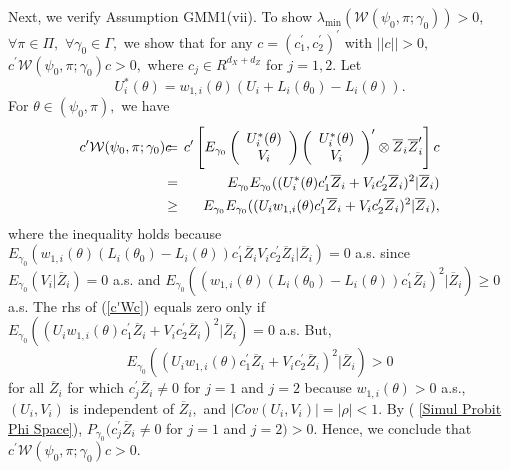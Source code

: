 \documentclass[12pt,titlepage,final,oneside,letterpaper]{article}
\begin{document}
Next, we verify Assumption GMM1(vii). To show $\lambda _{\min }(\mathcal{W}%
(\psi _{0},\pi ;\gamma _{0}))>0,$ $\forall \pi \in \Pi ,$ $\forall \gamma
_{0}\in \Gamma ,$ we show that for any $c=(c_{1}^{\prime },c_{2}^{\prime
})^{\prime }$ with $||c||>0,$ $c^{\prime }\mathcal{W}(\psi _{0},\pi ;\gamma
_{0})c>0,$ where $c_{j}\in R^{d_{X}+d_{Z}}$ for $j=1,2.$ Let%
\begin{equation}
U_{i}^{\ast }(\theta )=w_{1,i}(\theta )(U_{i}+L_{i}(\theta
_{0})-L_{i}(\theta )).  \label{GMM1(vii) 1}
\end{equation}%
For $\theta \in (\psi _{0},\pi ),$ we have%
\begin{eqnarray}
c^{\prime }\mathcal{W}(\psi _{0},\pi ;\gamma _{0})c\hspace{-0.08in} &=&%
\hspace{-0.08in}c^{\prime }\left[ E_{\gamma _{0}}\left( 
\begin{array}{c}
U_{i}^{\ast }(\theta ) \\ 
V_{i}%
\end{array}%
\right) \left( 
\begin{array}{c}
U_{i}^{\ast }(\theta ) \\ 
V_{i}%
\end{array}%
\right) ^{\prime }\otimes \overline{Z}_{i}\overline{Z}_{i}^{\prime }\right] c
\notag \\
&=&\hspace{-0.08in}E_{\gamma _{0}}E_{\gamma _{0}}((U_{i}^{\ast }(\theta
)c_{1}^{\prime }\overline{Z}_{i}+V_{i}c_{2}^{\prime }\overline{Z}_{i})^{2}|%
\overline{Z}_{i})  \notag \\
&\geq &\hspace{-0.08in}E_{\gamma _{0}}E_{\gamma _{0}}((U_{i}w_{1,i}(\theta
)c_{1}^{\prime }\overline{Z}_{i}+V_{i}c_{2}^{\prime }\overline{Z}_{i})^{2}|%
\overline{Z}_{i}),  \label{c'Wc}
\end{eqnarray}%
where the inequality holds because $E_{\gamma _{0}}(w_{1,i}(\theta
)(L_{i}(\theta _{0})-L_{i}(\theta ))c_{1}^{\prime }\overline{Z}%
_{i}V_{i}c_{2}^{\prime }\overline{Z}_{i}|\overline{Z}_{i})=0$ a.s. since $%
E_{\gamma _{0}}(V_{i}|\overline{Z}_{i})=0$ a.s. and $E_{\gamma
_{0}}((w_{1,i}(\theta )(L_{i}(\theta _{0})-L_{i}(\theta ))c_{1}^{\prime }%
\overline{Z}_{i})^{2}|\overline{Z}_{i})\geq 0$ a.s. The rhs of (\ref{c'Wc})
equals zero only if $E_{\gamma _{0}}((U_{i}w_{1,i}(\theta )c_{1}^{\prime }%
\overline{Z}_{i}+\allowbreak V_{i}c_{2}^{\prime }\overline{Z}_{i})^{2}|%
\overline{Z}_{i})=0$ a.s. But,%
\begin{equation}
E_{\gamma _{0}}((U_{i}w_{1,i}(\theta )c_{1}^{\prime }\overline{Z}%
_{i}+V_{i}c_{2}^{\prime }\overline{Z}_{i})^{2}|\overline{Z}_{i})>0
\label{GMM1(vii) 3}
\end{equation}%
for all $\overline{Z}_{i}$ for which $c_{j}^{\prime }\overline{Z}_{i}\neq 0$
for $j=1$ and $j=2$ because $w_{1,i}(\theta )>0$ a.s., $(U_{i},V_{i})$ is
independent of $\overline{Z}_{i},$ and $|Cov(U_{i},V_{i})|=|\rho |<1.$ By (%
\ref{Simul Probit Phi Space}), $P_{\gamma _{0}}(c_{j}^{\prime }\overline{Z}%
_{i}\neq 0$ for $j=1$ and $j=2)>0.$ Hence, we conclude that $c^{\prime }%
\mathcal{W}(\psi _{0},\pi ;\gamma _{0})c>0.$
\end{document}
